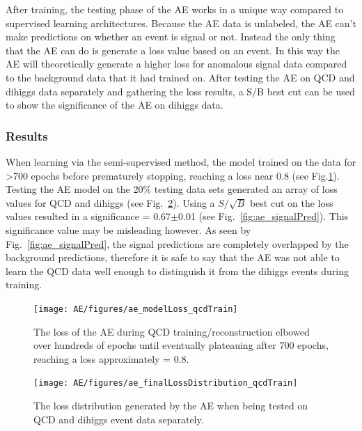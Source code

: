 After training, the testing phase of the AE works in a unique way compared to supervised learning architectures. Because the AE data is unlabeled, the AE can’t make predictions on whether an event is signal or not. Instead the only thing that the AE can do is generate a loss value based on an event. In this way the AE will theoretically generate a higher loss for anomalous signal data compared to the background data that it had trained on. After testing the AE on QCD and dihiggs data separately and gathering the loss results, a S/B best cut can be used to show the significance of the AE on dihiggs data.

\subsubsection{Results}
When learning via the semi-supervised method, the model trained on the data for >700 epochs before prematurely stopping, reaching a loss near 0.8 (see Fig.\ref{fig:ae_trainLoss}). Testing the AE model on the 20\% testing data sets generated an array of loss values for QCD and dihiggs (see Fig.~\ref{fig:ae_predLoss}). Using a $S/\sqrt{B}$ best cut on the loss values resulted in a significance = 0.67$\pm$0.01 (see Fig.~\ref{fig:ae_signalPred}). This significance value may be misleading however. As seen by Fig.~\ref{fig:ae_signalPred}, the signal predictions are completely overlapped by the background predictions, therefore it is safe to say that the AE was not able to learn the QCD data well enough to distinguish it from the dihiggs events during training. 

\begin{figure}[!h] 
\begin{center}
\texttt{[image: AE/figures/ae\_modelLoss\_qcdTrain]}
\caption{The loss of the AE during QCD training/reconstruction elbowed over hundreds of epochs until eventually plateauing after 700 epochs, reaching a loss approximately = 0.8.}
  \label{fig:ae_trainLoss}
\end{center}
\end{figure}

\begin{figure}[!h] 
\begin{center}
\texttt{[image: AE/figures/ae\_finalLossDistribution\_qcdTrain]}
\caption{The loss distribution generated by the AE when being tested on QCD and dihiggs event data separately.}
  \label{fig:ae_predLoss}
\end{center}
\end{figure}


